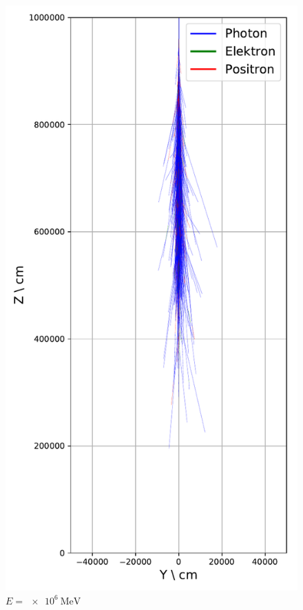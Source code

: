 \documentclass[aspectratio=1610, captions=tableheading, 11pt]{beamer}
\begin{document}
\begin{frame}
\begin{columns}
    \begin{column}{0.33\textwidth}
      \begin{figure}
          \centering
          \includegraphics[height=0.9\textheight]{shower_presentation/2d_shower_1e6.pdf}
          \caption*{$E = \SI{e6}{\mega\electronvolt}$}
      \end{figure}
    \end{column}


\end{columns}
\end{frame}
\end{document}
